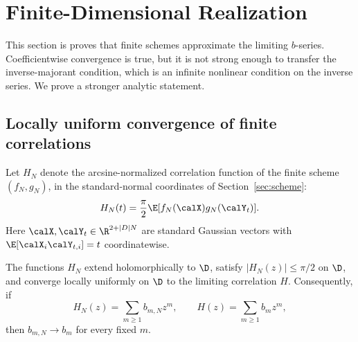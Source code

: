 \section{Finite-Dimensional Realization}
\label{sec:transfer}

This section is proves that finite schemes approximate the limiting $b$-series.  Coefficientwise convergence is true, but it is not strong enough to transfer the inverse-majorant condition, which is an infinite nonlinear condition on the inverse series.  We prove a stronger analytic statement.

\subsection{Locally uniform convergence of finite correlations}

Let $H_N$ denote the arcsine-normalized correlation function of the finite scheme $(f_N,g_N)$, in the standard-normal coordinates of Section~\ref{sec:scheme}:
\[
  H_N(t)={\pi\over2}\E[f_N(\calX)g_N(\calY_t)].
\]
Here $\calX,\calY_t\in\R^{2+|D|N}$ are standard Gaussian vectors with $\E[\calX_i\calY_{t,i}]=t$ coordinatewise.

\begin{proposition}\label{prop:loc-unif}
The functions $H_N$ extend holomorphically to $\D$, satisfy $|H_N(z)|\le\pi/2$ on $\D$, and converge locally uniformly on $\D$ to the limiting correlation $H$.  Consequently, if
\[
  H_N(z)=\sum_{m\ge1}b_{m,N}z^m,
  \qquad
  H(z)=\sum_{m\ge1}b_mz^m,
\]
then $b_{m,N}\to b_m$ for every fixed $m$.
\end{proposition}

